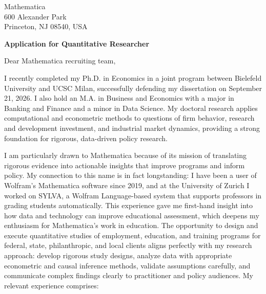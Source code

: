 \documentclass[11pt]{article}
\begin{document}
\vspace{0.1cm}

\vspace{0.1cm}

\noindent
Mathematica \\
600 Alexander Park \\
Princeton, NJ 08540, USA

\vspace{0.12cm}

\noindent
\textbf{Application for Quantitative Researcher}

\vspace{0.1cm}

\noindent Dear Mathematica recruiting team,

I recently completed my Ph.D. in Economics in a joint program between Bielefeld University and UCSC Milan,
successfully defending my dissertation on September 21, 2026.
I also hold an M.A. in Business and Economics with a major in Banking and Finance and a minor in Data Science.
My doctoral research applies computational and econometric methods to questions of firm behavior, 
research and development investment, and industrial market dynamics,
providing a strong foundation for rigorous, data-driven policy research.

I am particularly drawn to Mathematica because of its mission of translating rigorous evidence into actionable insights that improve programs and inform policy.
My connection to this name is in fact longstanding: 
I have been a user of Wolfram's Mathematica software since 2019,
and at the University of Zurich I worked on SYLVA, a Wolfram Language-based system that supports professors in grading students automatically.
This experience gave me first-hand insight into how data and technology can improve educational assessment,
which deepens my enthusiasm for Mathematica's work in education.
The opportunity to design and execute quantitative studies of employment, education, and training programs for federal, state, philanthropic, and local clients
aligns perfectly with my research approach:
develop rigorous study designs, analyze data with appropriate econometric and causal inference methods,
validate assumptions carefully, and communicate complex findings clearly to practitioner and policy audiences.
My relevant experience comprises:
\end{document}
